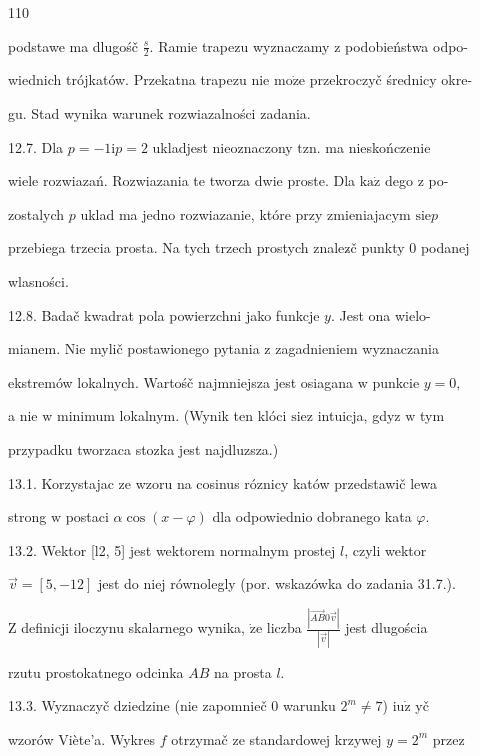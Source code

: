 \documentclass[a4paper,12pt]{article}
\begin{document}
110

podstawe ma dlugośč $\displaystyle \frac{s}{2}$. Ramie trapezu wyznaczamy $\mathrm{z}$ podobieństwa odpo-

wiednich trójkatów. Przekatna trapezu nie $\mathrm{m}\mathrm{o}\dot{\mathrm{z}}\mathrm{e}$ przekroczyč średnicy okre-

gu. Stad wynika warunek rozwiazalności zadania.

12.7. Dla $p=-1\mathrm{i}p=2$ ukladjest nieoznaczony $\mathrm{t}\mathrm{z}\mathrm{n}$. ma nieskończenie

wiele rozwiazań. Rozwiazania te tworza dwie proste. Dla $\mathrm{k}\mathrm{a}\dot{\mathrm{z}}$ dego $\mathrm{z}$ po-

zostalych $p$ uklad ma jedno rozwiazanie, które przy zmieniajacym $\mathrm{s}\mathrm{i}\mathrm{e}p$

przebiega trzecia prosta. Na tych trzech prostych znalez$\acute{}$č punkty $0$ podanej

wlasności.

12.8. Badač kwadrat pola powierzchni jako funkcje $y$. Jest ona wielo-

mianem. Nie mylič postawionego pytania $\mathrm{z}$ zagadnieniem wyznaczania

ekstremów lokalnych. Wartośč najmniejsza jest osiagana $\mathrm{w}$ punkcie $y=0,$

a nie $\mathrm{w}$ minimum lokalnym. (Wynik ten klóci $\mathrm{s}\mathrm{i}\mathrm{e}\mathrm{z}$ intuicja, gdyz $\mathrm{w}$ tym

przypadku tworzaca stozka jest najdluzsza.)

13.1. Korzystajac ze wzoru na cosinus róznicy katów przedstawič lewa

strong $\mathrm{w}$ postaci $\alpha\cos(x-\varphi)$ dla odpowiednio dobranego kata $\varphi.$

13.2. Wektor [l2, 5] jest wektorem normalnym prostej $l$, czyli wektor

$\vec{v}= [5,-12]$ jest do niej równolegly (por. wskazówka do zadania 31.7.).

$\mathrm{Z}$ definicji iloczynu skalarnego wynika, $\dot{\mathrm{z}}\mathrm{e}$ liczba $\displaystyle \frac{|\vec{AB}0\vec{v}|}{|\vec{v}|}$ jest dlugościa

rzutu prostokatnego odcinka $AB$ na prosta $l.$

13.3. Wyznaczyč dziedzine (nie zapomnieč $0$ warunku $2^{m}\neq 7$) $\mathrm{i}\mathrm{u}\dot{\mathrm{z}}$ yč

wzorów Viète'a. Wykres $f$ otrzymač ze standardowej krzywej $y=2^{m}$ przez
\end{document}
